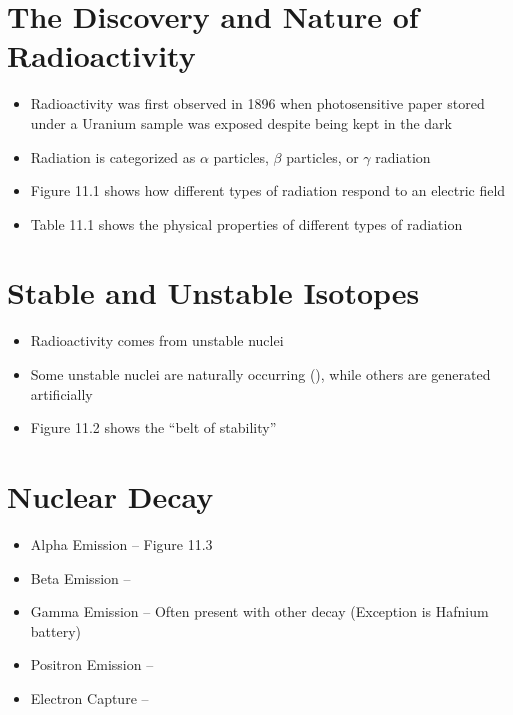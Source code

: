 \documentclass[12pt, openany, letterpaper]{memoir}
\begin{document}
\section{The Discovery and Nature of Radioactivity}
\begin{itemize}
	\item Radioactivity was first observed in 1896 when photosensitive paper stored under a Uranium sample was exposed despite being kept in the dark
	\item Radiation is categorized as $\alpha$ particles, $\beta$ particles, or $\gamma$ radiation
	\item Figure 11.1 shows how different types of radiation respond to an electric field
	\item Table 11.1 shows the physical properties of different types of radiation
\end{itemize}

\section{Stable and Unstable Isotopes}
\begin{itemize}
	\item Radioactivity comes from unstable nuclei
	\item Some unstable nuclei are naturally occurring (), while others  are generated artificially
	\item Figure 11.2 shows the ``belt of stability''
\end{itemize}

\section{Nuclear Decay}
\begin{itemize}
	\item Alpha Emission -- Figure 11.3


	\item Beta Emission -- ~~ 


	\item Gamma Emission -- Often present with other decay (Exception is Hafnium battery)

	\item Positron Emission -- ~~ 

	\item Electron Capture -- ~~ 

\end{itemize}
\end{document}
